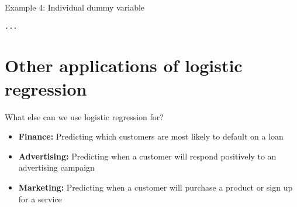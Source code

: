 \documentclass{beamer}\usepackage[]{graphicx}\usepackage[]{color}
\makeatletter
\newenvironment{kframe}{%
 \def\at@end@of@kframe{}%
 \ifinner\ifhmode%
  \def\at@end@of@kframe{\end{minipage}}%
  \begin{minipage}{\columnwidth}%
 \fi\fi%
 \def\FrameCommand##1{\hskip\@totalleftmargin \hskip-\fboxsep
 \colorbox{shadecolor}{##1}\hskip-\fboxsep
     \hskip-\linewidth \hskip-\@totalleftmargin \hskip\columnwidth}%
 \MakeFramed {\advance\hsize-\width
   \@totalleftmargin\z@ \linewidth\hsize
   \@setminipage}}%
 {\par\unskip\endMakeFramed%
 \at@end@of@kframe}
\newenvironment{knitrout}{}{} %
\makeatother
\begin{document}
\begin{darkframes}
\begin{frame}[fragile]{Example 4: Individual dummy variable}
\begin{knitrout}
\begin{kframe}
\begin{verbatim}
...

\end{verbatim}
\end{kframe}
\end{knitrout}
    \end{frame}

    \section{Other applications of logistic regression}

    \begin{frame}{What else can we use logistic regression for?}
      \begin{itemize}
        \item \textbf{Finance:} Predicting which customers are most likely to default on a loan
        \item \textbf{Advertising:} Predicting when a customer will respond positively to an advertising campaign
        \item \textbf{Marketing:} Predicting when a customer will purchase a product or sign up for a service
      \end{itemize}
    \end{frame}
  \end{darkframes}
\end{document}
